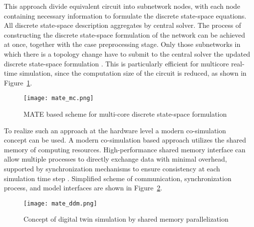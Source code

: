 This approach divide equivalent circuit into subnetwork nodes, with each node containing necessary information to formulate the discrete state-space equations. All discrete state-space description aggregates by central solver. The process of constructing the discrete state-space formulation of the network can be achieved at once, together with the case preprocessing stage. Only those subnetworks in which there is a topology change have to submit to the central solver the updated discrete state-space formulation \autocite{Hollman_2006}. This is particularly efficient for multicore real-time simulation, since the computation size of the circuit is reduced, as shown in Figure~\cref{fig:mate_mc}.

\begin{figure}[htbp]
    \centering
    \texttt{[image: mate\_mc.png]}
    \caption{MATE based scheme for multi-core discrete state-space formulation}
    \label{fig:mate_mc}
\end{figure}

To realize such an approach at the hardware level a modern co-simulation concept can be used. A modern co-simulation based approach utilizes the shared memory of computing resources. High-performance shared memory interface can allow multiple processes to directly exchange data with minimal overhead, supported by synchronization mechanisms to ensure consistency at each simulation time step \autocite{Marcus_2021, 8973964}. Simplified scheme of communication, synchronization process, and model interfaces are shown in Figure~\cref{fig:mate_ddm}.

\begin{figure}[htbp]
    \centering
    \texttt{[image: mate\_ddm.png]}
    \caption{Concept of digital twin simulation by shared memory parallelization}
    \label{fig:mate_ddm}
\end{figure}


